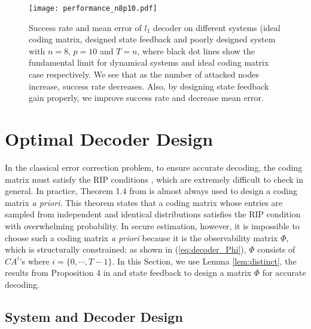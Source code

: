 \documentclass[journal]{IEEEtran}
\begin{document}
\begin{figure*}[!t]
\center
\texttt{[image: performance\_n8p10.pdf]}
\caption{Success rate and mean error of $l_1$ decoder on different systems (ideal coding matrix, designed state feedback and poorly designed system with $n=8$, $p=10$ and $T=n$, where black dot lines show the fundamental limit for dynamical systems and ideal coding matrix case respectively. We see that as the number of attacked nodes increase, success rate decreases. Also, by designing state feedback gain properly, we improve success rate and decrease mean error. }
\label{fig:ex_n8p10}
\end{figure*}



\section{Optimal Decoder Design}\label{sec:design}
 
In the classical error correction problem, to ensure accurate decoding, the coding matrix must satisfy the RIP conditions  \cite{Candes_Tao}, which are extremely difficult to check in general. In practice, Theorem 1.4 from\cite{Candes_Tao} is almost always used to design a coding matrix {\it a priori}. This theorem states that a coding matrix whose entries are sampled from independent and identical distributions satisfies the RIP condition with overwhelming probability. 
In secure estimation, however, it is impossible to choose such a coding matrix {\it a priori} because it is the observability matrix $\Phi$, which is structurally constrained: as shown in (\ref{eq:decoder_Phi}), $\Phi$ consists of $CA^{i}$'s where $i=\{0, \cdots, T-1\}$. In this Section, we use Lemma \ref{lem:distinct}, the results from Proposition 4 in \cite{Fawzi2014} and state feedback to design a matrix $\Phi$ for accurate decoding. 




\subsection{System and Decoder Design}\label{sec:decoder_design}
\end{document}

